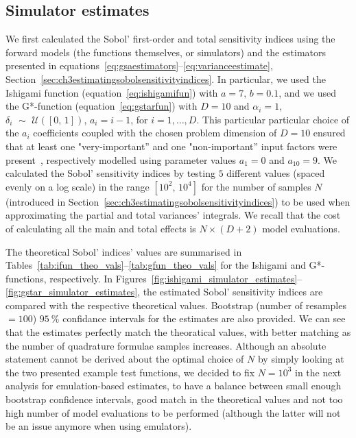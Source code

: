\subsection{Simulator estimates}\label{sec:chAsimulator_estimates}
We first calculated the Sobol' first-order and total sensitivity indices using the forward models (the functions themselves, or simulators) and the estimators presented in equations~\eqref{eq:gsaestimators}--\eqref{eq:varianceestimate}, Section~\ref{sec:ch3estimatingsobolsensitivityindices}. In particular, we used the Ishigami function (equation~\eqref{eq:ishigamifun}) with $a=7,\,b=0.1$, and we used the G*-function (equation~\eqref{eq:gstarfun}) with $D=10$ and $\alpha_i=1$, $\delta_i\,\,\sim\,\,\mathcal{U}([0,\,1])$, $a_i=i-1$, for $i=1,\dots,D$. This particular particular choice of the $a_i$ coefficients coupled with the chosen problem dimension of $D=10$ ensured that at least one "very-important'' and one "non-important'' input factors were present~\cite{Saltelli:2010,Marrel:2008}, respectively modelled using parameter values $a_1=0$ and $a_{10}=9$. We calculated the Sobol' sensitivity indices by testing $5$ different values (spaced evenly on a log scale) in the range $[10^2,\,10^4]$ for the number of samples $N$ (introduced in Section~\ref{sec:ch3estimatingsobolsensitivityindices}) to be used when approximating the partial and total variances' integrals. We recall that the cost of calculating all the main and total effects is $N\times(D+2)$ model evaluations.

\vspace{0.2cm}
The theoretical Sobol' indices' values are summarised in Tables~\ref{tab:ifun_theo_vals}--\ref{tab:gfun_theo_vals} for the Ishigami and G*- functions, respectively. In Figures~\ref{fig:ishigami_simulator_estimates}--\ref{fig:gstar_simulator_estimates}, the estimated Sobol' sensitivity indices are compared with the respective theoretical values. Bootstrap (number of resamples $=100$) $\SI{95}{\percent}$ confidance intervals for the estimates are also provided. We can see that the estimates perfectly match the theoratical values, with better matching as the number of quadrature formulae samples increases. Although an absolute statement cannot be derived about the optimal choice of $N$ by simply looking at the two presented example test functions, we decided to fix $N=10^3$ in the next analysis for emulation-based estimates, to have a balance between small enough bootstrap confidence intervals, good match in the theoretical values and not too high number of model evaluations to be performed (although the latter will not be an issue anymore when using emulators).

